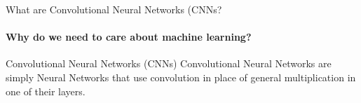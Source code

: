 \begin{frame}{What are Convolutional Neural Networks (CNNs?}
    \framesubtitle{Why do we need to care about machine learning?}
    \begin{itemize}
        \begin{block}{Convolutional Neural Networks (CNNs)}
            Convolutional Neural Networks are simply Neural Networks that use convolution in place of general multiplication in one of their layers.
        \end{block}
    \end{itemize}
\end{frame}